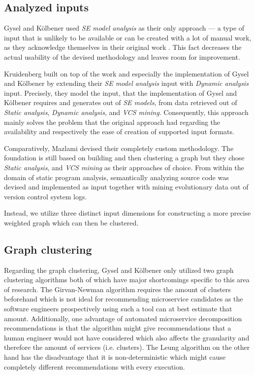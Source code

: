 \documentclass[12pt,a4paper]{report}
\begin{document}
\subsection{Analyzed inputs}

Gysel and K{\"o}lbener used \textit{SE model analysis} as their only approach ---
a type of input that is unlikely to be available or
can be created with a lot of manual work, as they acknowledge
themselves in their original work \cite{gysel2016service}.
This fact decreases the actual usability of the devised methodology and leaves
room for improvement.

Kruidenberg \cite{kruidenberg2018monoliths} built on top of the work and
especially the implementation of Gysel and K{\"o}lbener by extending their
\textit{SE model analysis} input with \textit{Dynamic analysis} input.
Precisely, they model the input, that the implementation of Gysel and K{\"o}lbener
requires and generates out of \textit{SE models}, from data retrieved
out of \textit{Static analysis}, \textit{Dynamic analysis}, and \textit{VCS mining}.
Consequently, this approach mainly solves the problem that the original approach
had regarding the availability and respectively the ease of creation
of supported input formats.

Comparatively, Mazlami \cite{mazlami2017extraction} devised their completely
custom methodology. The foundation is still based on building and then clustering
a graph but they chose \textit{Static analysis}, and \textit{VCS mining} as
their approaches of choice. From within the domain of static program analysis,
semantically analyzing source code was devised and implemented as input together
with mining evolutionary data out of version control system logs.

Instead, we utilize three distinct input dimensions for constructing
a more precise weighted graph which can then be clustered.


\subsection{Graph clustering}

Regarding the graph clustering, Gysel and K{\"o}lbener \cite{gysel2016service}
only utilized two graph clustering algorithms both of which have major
shortcomings specific to this area of research.
The Girvan-Newman algorithm \cite{girvan2002community} requires the
amount of clusters beforehand which is not ideal for recommending
microservice candidates as the software engineers prospectively using
such a tool can at best estimate that amount.
Additionally, one advantage of automated microservice decomposition recommendations
is that the algorithm might give recommendations that a human engineer would
not have considered which also affects the granularity and therefore the
amount of services (i.e. clusters).
The Leung algorithm \cite{leung2009community} on the other hand has the
disadvantage that it is non\hyp deterministic which might cause completely
different recommendations with every execution.
\end{document}

